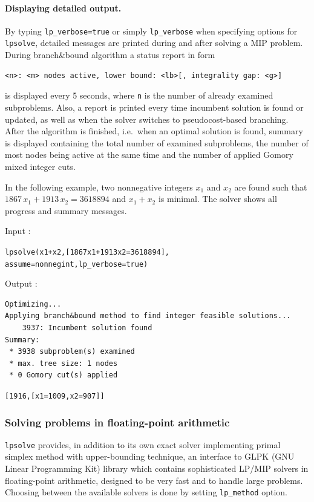 \documentclass[a4paper,11pt]{book}
\begin{document}
\paragraph{Displaying detailed output.}
By typing {\tt lp\_verbose=true} or simply {\tt lp\_verbose} when specifying options for {\tt lpsolve}, detailed messages are printed during and after solving a MIP problem. During branch\&bound algorithm a status report in form
\begin{verbatim}
<n>: <m> nodes active, lower bound: <lb>[, integrality gap: <g>]
\end{verbatim}
is displayed every 5 seconds, where {\tt n} is the number of already examined subproblems. Also, a report is printed every time incumbent solution is found or updated, as well as when the solver switches to pseudocost-based branching. After the algorithm is finished, i.e.~when an optimal solution is found, summary is displayed containing the total number of examined subproblems, the number of most nodes being active at the same time and the number of applied Gomory mixed integer cuts. 

In the following example, two nonnegative integers $ x_1 $ and $ x_2 $ are found such that $ 1867\,x_1+1913\,x_2=3618894 $ and $ x_1+x_2 $ is minimal. The solver shows all progress and summary messages.

\noindent Input :
\begin{center}
	\tt lpsolve(x1+x2,[1867x1+1913x2=3618894],\\
	assume=nonnegint,lp\_verbose=true)
\end{center}
Output :
\begin{verbatim}
Optimizing...
Applying branch&bound method to find integer feasible solutions...
    3937: Incumbent solution found
Summary:
 * 3938 subproblem(s) examined
 * max. tree size: 1 nodes
 * 0 Gomory cut(s) applied
\end{verbatim}
\begin{center}
	\tt [1916,[x1=1009,x2=907]]
\end{center}

\subsubsection{Solving problems in floating-point arithmetic}
{\tt lpsolve} provides, in addition to its own exact solver implementing primal simplex method with upper-bounding technique, an interface to GLPK (GNU Linear Programming Kit) library which contains sophisticated LP/MIP solvers in floating-point arithmetic, designed to be very fast and to handle large problems. Choosing between the available solvers is done by setting {\tt lp\_method} option.
\end{document}
